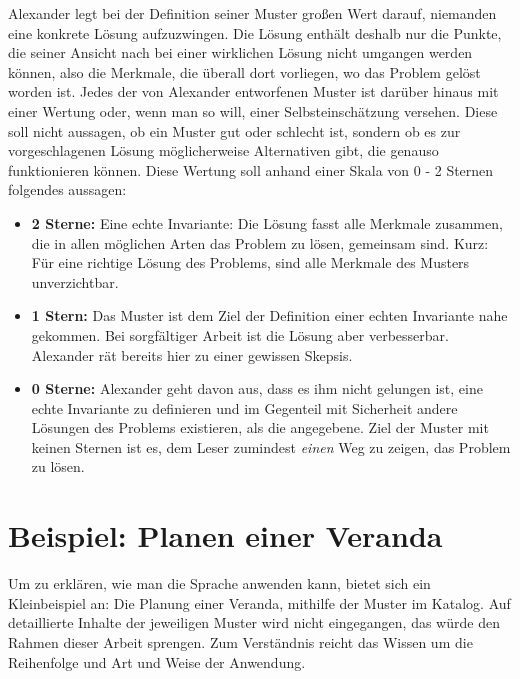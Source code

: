 \documentclass[fontsize=11pt,a4paper,final]{scrreprt}[2003/01/01]
\begin{document}
Alexander legt bei der Definition seiner Muster großen Wert darauf, niemanden eine konkrete Lösung aufzuzwingen. Die Lösung enthält deshalb nur die Punkte, die seiner Ansicht nach bei einer wirklichen Lösung nicht umgangen werden können, also die Merkmale, die überall dort vorliegen, wo das Problem gelöst worden ist. Jedes der von Alexander entworfenen Muster ist darüber hinaus mit einer Wertung oder, wenn man so will, einer  Selbsteinschätzung versehen. Diese soll nicht aussagen, ob ein Muster gut oder schlecht ist, sondern ob es zur vorgeschlagenen Lösung möglicherweise Alternativen gibt, die genauso funktionieren können. Diese Wertung soll anhand einer Skala von 0 - 2 Sternen folgendes aussagen:
\begin{itemize}
	\item \textbf{2 Sterne:} Eine echte Invariante: Die Lösung fasst alle Merkmale zusammen, die in allen möglichen Arten das Problem zu lösen, gemeinsam sind. Kurz: Für eine richtige Lösung des Problems, sind alle Merkmale des Musters unverzichtbar.
	\item \textbf{1 Stern:} Das Muster ist dem Ziel der Definition einer echten Invariante nahe gekommen. Bei sorgfältiger Arbeit ist die Lösung aber verbesserbar. Alexander rät bereits hier zu einer gewissen Skepsis.
	\item \textbf{0 Sterne:} Alexander geht davon aus, dass es ihm nicht gelungen ist, eine echte Invariante zu definieren und im Gegenteil mit Sicherheit andere Lösungen des Problems existieren, als die angegebene. Ziel der Muster mit keinen Sternen ist es, dem Leser zumindest \textit{einen} Weg zu zeigen, das Problem zu lösen.
\end{itemize}

\section{Beispiel: Planen einer Veranda}
Um zu erklären, wie man die Sprache anwenden kann, bietet sich ein Kleinbeispiel an: Die Planung einer Veranda, mithilfe der Muster im Katalog. Auf detaillierte Inhalte der jeweiligen Muster wird nicht eingegangen, das würde den Rahmen dieser Arbeit sprengen. Zum Verständnis reicht das Wissen um die Reihenfolge und Art und Weise der Anwendung. \\ \\
\end{document}

